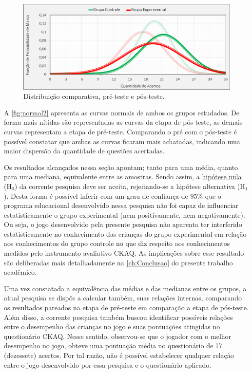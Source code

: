 \begin{figure}[htb]
    \centering
    \caption{\label{fig:normal2}Distribuição comparativa, pré-teste e pós-teste.}
    \includegraphics[width=\linewidth]{./Visuais/GraficosAntesDepois.pdf}
\end{figure}

A \autoref{fig:normal2} apresenta as curvas normais de ambos os grupos estudados. De forma mais nítidas são representadas as curvas da etapa de pós-teste, as demais curvas representam a etapa de pré-teste. Comparando o pré com o pós-teste é possível constatar que ambas as curvas ficaram mais achatadas, indicando uma maior dispersão da quantidade de questões acertadas. 

Os resultados alcançados nessa seção apontam; tanto para uma média, quanto para uma mediana, equivalente entre as amostras. Sendo assim, a \hyperref[hipotese]{hipótese nula} (H$_0$) da corrente pesquisa deve ser aceita, rejeitando-se a hipótese alternativa (H$_1$). Desta forma é possível inferir com um grau de confiança de 95\% que o programa educacional desenvolvido nessa pesquisa não foi capaz de influenciar estatisticamente o grupo experimental (nem positivamente, nem negativamente). Ou seja, o jogo desenvolvido pela presente pesquisa não aparenta ter interferido estatisticamente no conhecimento das crianças do grupo experimental em relação aos conhecimentos do grupo controle no que diz respeito aos conhecimentos medidos pelo instrumento avaliativo \ac{CKAQ}. As implicações sobre esse resultado são deliberadas mais detalhadamente na \autoref{ch:Conclusao} do presente trabalho acadêmico.

Uma vez constatada a equivalência das médias e das medianas entre os grupos, a atual pesquisa se dispôs a calcular também, suas relações internas, comparando os resultados pareados na etapa de pré-teste em comparação a etapa de pós-teste. Além disso, a corrente pesquisa também buscou identificar possíveis relações entre o desempenho das crianças no jogo e suas pontuações atingidas no questionário \ac{CKAQ}. Nesse sentido, observou-se que o jogador com o melhor desempenho no jogo, obteve uma pontuação média no questionário de 17 (dezessete) acertos. Por tal razão, não é possível estabelecer qualquer relação entre o jogo desenvolvido por essa pesquisa e o questionário aplicado. 

